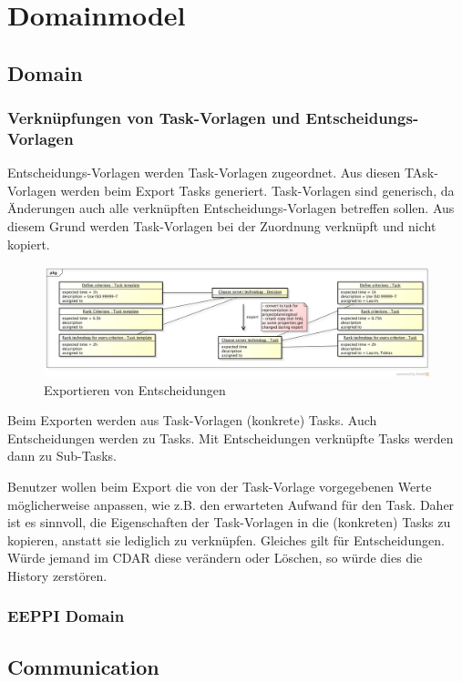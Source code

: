 	\section{Domainmodel} 
		\subsection{Domain}
		
			\subsubsection{Verknüpfungen von Task-Vorlagen und Entscheidungs-Vorlagen}			
				Entscheidungs-Vorlagen werden Task-Vorlagen zugeordnet.
				Aus diesen TAsk-Vorlagen werden beim Export Tasks generiert.
				Task-Vorlagen sind generisch, da Änderungen auch alle verknüpften Entscheidungs-Vorlagen betreffen sollen.
				Aus diesem Grund werden Task-Vorlagen bei der Zuordnung verknüpft und nicht kopiert.
				
				\begin{figure}[H]
					\includegraphics[width=\textwidth]{architecture/media/img/DecisionTaskRelation.jpg}
					\centering
					\caption{Exportieren von Entscheidungen}
					\label{fig:DecisionTaskRelation}
				\end{figure}
				
				Beim Exporten werden aus Task-Vorlagen (konkrete) Tasks.
				Auch Entscheidungen werden zu Tasks.
				Mit Entscheidungen verknüpfte Tasks werden dann zu Sub-Tasks.
				
				Benutzer wollen beim Export die von der Task-Vorlage vorgegebenen Werte möglicherweise anpassen, wie z.B. den erwarteten Aufwand für den Task.
				Daher ist es sinnvoll, die Eigenschaften der Task-Vorlagen in die (konkreten) Tasks zu kopieren, anstatt sie lediglich zu verknüpfen.
				Gleiches gilt für Entscheidungen. Würde jemand im CDAR diese verändern oder Löschen, so würde dies die History zerstören.
				
			
			\subsubsection{EEPPI Domain}
			
				
		
		\subsection{Communication}